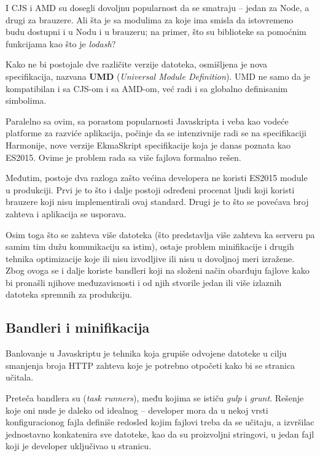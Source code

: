 I CJS i AMD su dosegli dovoljnu popularnost da se smatraju  -- jedan za Node, a drugi za brauzere.
Ali šta je sa modulima za koje ima smisla da istovremeno budu dostupni i u Nodu i u brauzeru; na primer, što su biblioteke sa pomoćnim funkcijama kao što je \textsl{lodash}?

Kako ne bi postojale dve različite verzije datoteka, osmišljena je nova specifikacija, nazvana \textbf{UMD} (\textsl{Universal Module Definition}).
UMD ne samo da je kompatibilan i sa CJS-om i sa AMD-om, već radi i sa globalno definisanim simbolima.

Paralelno sa ovim, sa porastom popularnosti Javaskripta i veba kao vodeće platforme za razviće aplikacija, počinje da se intenzivnije radi se na specifikaciji Harmonije, nove verzije EkmaSkript specifikacije koja je danas poznata kao ES2015.
Ovime je problem rada sa više fajlova formalno rešen.

Međutim, postoje dva razloga zašto većina developera ne koristi ES2015 module u produkciji.
Prvi je to što i dalje postoji određeni procenat ljudi koji koristi brauzere koji nisu implementirali ovaj standard.
Drugi je to što se povećava broj zahteva i aplikacija se usporava.

Osim toga što se zahteva više datoteka (što predstavlja više zahteva ka serveru pa samim tim dužu komunikaciju sa istim), ostaje problem minifikacije i drugih tehnika optimizacije koje ili nisu izvodljive ili nisu u dovoljnoj meri izražene.
Zbog ovoga se i dalje koriste bandleri koji na složeni način obarđuju fajlove kako bi pronašli njihove međuzavisnosti i od njih stvorile jedan ili više izlaznih datoteka spremnih za produkciju.

\subsection{Bandleri i minifikacija}

Banlovanje u Javaskriptu je tehnika koja grupiše odvojene datoteke u cilju smanjenja broja HTTP zahteva koje je potrebno otpočeti kako bi se stranica učitala.

Preteča bandlera su  (\textsl{task runners}), među kojima se ističu \textsl{gulp} i \textsl{grunt}.
Rešenje koje oni nude je daleko od idealnog -- developer mora da u nekoj vrsti konfiguracionog fajla definiše redosled kojim fajlovi treba da se učitaju, a izvršilac jednostavno konkatenira sve datoteke, kao da su proizvoljni stringovi, u jedan fajl koji je developer uključivao u stranicu.

